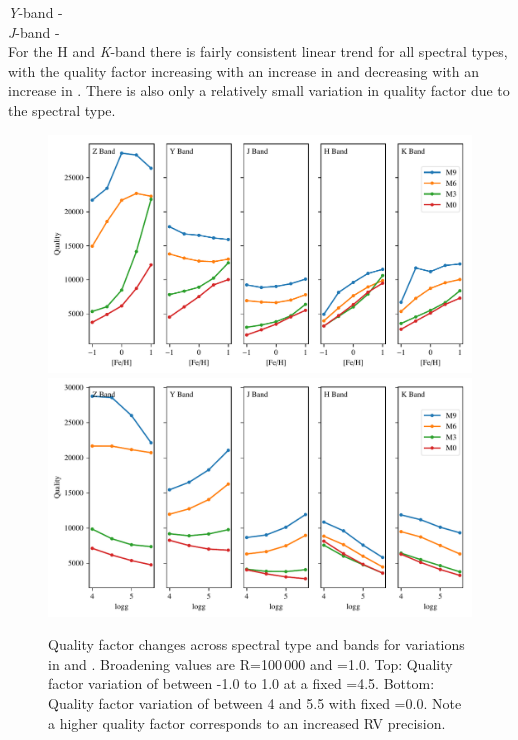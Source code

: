 {\emph{Y}-band -\\

\emph{J}-band - \\

For the H and \emph{K}-band there is fairly consistent linear trend for all spectral types, with the quality factor increasing with an increase in \feh{} and decreasing with an increase in \Logg{}.
There is also only a relatively small variation in quality factor due to the spectral type.



\begin{figure}
\includegraphics[width=0.99\linewidth]{figures/information-content/metalicity_effect.pdf}\\
\includegraphics[width=0.99\linewidth]{figures/information-content/logg_effect.pdf}
\caption[Quality factor verse \feh{} and \Logg{} for different spectral types and wavelength bands.]{Quality factor changes across spectral type and bands for variations in \feh{} and \Logg{}.
Broadening values are R=100\,000 and \Vsini{}=1.0\kmps{}.
Top: Quality factor variation of \feh{} between -1.0 to 1.0 at a fixed \Logg{}=4.5.
Bottom: Quality factor variation of \Logg{} between 4 and 5.5 with fixed \feh{}=0.0.
Note a higher quality factor corresponds to an increased {RV} precision.}
\label{fig:deviations}
\end{figure}


}
